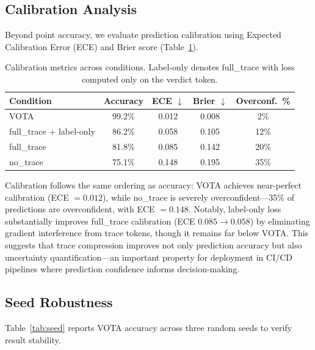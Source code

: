 \documentclass[11pt]{article}
\newcommand{\vota}{\textsc{VOTA}}
\begin{document}
\subsection{Calibration Analysis}

Beyond point accuracy, we evaluate prediction calibration using Expected Calibration Error (ECE) and Brier score (Table~\ref{tab:calibration}).

\begin{table}[t]
\centering
\caption{Calibration metrics across conditions. Label-only denotes full\_trace with loss computed only on the verdict token.}
\label{tab:calibration}
\small
\begin{tabular}{lcccc}
\toprule
\textbf{Condition} & \textbf{Accuracy} & \textbf{ECE $\downarrow$} & \textbf{Brier $\downarrow$} & \textbf{Overconf.\ \%} \\
\midrule
\vota{} & 99.2\% & 0.012 & 0.008 & 2\% \\
full\_trace + label-only & 86.2\% & 0.058 & 0.105 & 12\% \\
full\_trace & 81.8\% & 0.085 & 0.142 & 20\% \\
no\_trace & 75.1\% & 0.148 & 0.195 & 35\% \\
\bottomrule
\end{tabular}
\end{table}

Calibration follows the same ordering as accuracy: \vota{} achieves near-perfect calibration (ECE $= 0.012$), while no\_trace is severely overconfident---35\% of predictions are overconfident, with ECE $= 0.148$. Notably, label-only loss substantially improves full\_trace calibration (ECE $0.085 \to 0.058$) by eliminating gradient interference from trace tokens, though it remains far below \vota{}. This suggests that trace compression improves not only prediction accuracy but also uncertainty quantification---an important property for deployment in CI/CD pipelines where prediction confidence informs decision-making.

\subsection{Seed Robustness}

Table~\ref{tab:seed} reports \vota{} accuracy across three random seeds to verify result stability.
\end{document}
